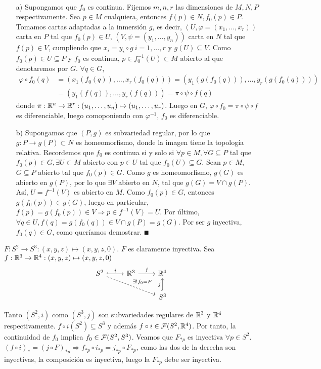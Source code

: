 \documentclass[Cursovd_portada.tex]{subfiles}
\begin{document}
\begin{dem}\
\begin{itemize}
\item[a)] Supongamos que $f_0$ es continua. Fijemos $m,n,r$ las dimensiones de $M,N,P$ respectivamente. Sea $p\in M$ cualquiera, entonces $f(p)\in N, f_0(p)\in P$. Tomamos cartas adaptadas a la inmersión $g$, es decir, $(U,\varphi=(x_1,\dots,x_r))$ carta en $P$ tal que $f_0(p)\in U$, $(V,\psi=(y_1,\dots,y_n))$ carta en $N$ tal que $f(p)\in V$, cumpliendo que $x_i=y_i\circ g\ i=1,\dots, r$ y $g(U)\subseteq V$. Como $f_0(p)\in U\subseteq P$ y $f_0$ es continua, $p\in f_0^{-1}(U)\subset M$ abierto al que denotaremos por $G$. $\forall q\in G$, 
\begin{align*}
\varphi \circ f_0(q)&=(x_1(f_0(q)),\dots,x_r(f_0(q)))= (y_1(g(f_0(q))),\dots,y_r(g(f_0(q))))\\
&=(y_1(f(q)),\dots,y_r(f(q)))=\pi\circ\psi\circ f(q)
\end{align*}
donde $\pi:\mathbb{R}^n\to\mathbb{R}^r: (u_1,\dots, u_n)\mapsto (u_1,\dots,u_r)$. Luego en $G$, $\varphi\circ f_0=\pi\circ\psi\circ f$ es diferenciable, luego comoponiendo con $\varphi^{-1}$, $f_0$ es diferenciable.
\item[b)] Supongamos que $(P,g)$ es subvariedad regular, por lo que $g:P\to g(P)\subset N$ es homeomorfismo, donde la imagen tiene la topología relativa. Recordemos que $f_0$ es continua si y solo si $\forall p\in M,\forall G\subseteq P$ tal que $f_0(p)\in G,\exists U\subset M$ abierto con $p\in U$ tal que $f_0(U)\subseteq G$. Sean $p\in M$, $G\subseteq P$ abierto tal que $f_0(p)\in G$. Como $g$ es homeomorfismo, $g(G)$ es abierto en $g(P)$, por lo que $\exists V$ abierto en $N$, tal que $g(G)=V\cap g(P)$. Así, $U=f^{-1}(V)$ es abierto en $M$. Como $f_0(p)\in G$, entonces $g(f_0(p))\in g(G)$, luego en particular, $f(p)=g(f_0(p))\in V\Rightarrow p\in f^{-1}(V)=U$. Por último, $\forall q\in U, f(q)=g(f_0(q))\in V\cap g(P)=g(G)$. Por ser $g$ inyectiva, $f_0(q)\in G$, como queríamos demostrar.   $\QED$
\end{itemize}

\end{dem}

\begin{ej}
$F:S^2\to S^3:(x,y,z)\mapsto (x,y,z,0)$. $F$ es claramente inyectiva. Sea $f:\mathbb{R}^3\to\mathbb{R}^4:(x,y,z)\mapsto (x,y,z,0)$
\[
\begin{tikzcd}
S^2\arrow[r, hookrightarrow, "i"]\arrow[rrd, dashed, "\exists! f_0=F"] & \R^3\arrow[r,"f"] & \R^4\\
& & S^3\arrow[u, hookrightarrow, "j"]
\end{tikzcd}
\]

Tanto $(S^2,i)$ como $(S^3,j)$ son subvariedades regulares de $\mathbb{R}^3$ y $\mathbb{R}^4$ respectivamente. $f\circ i(S^2)\subseteq  S^3$ y además $f\circ i\in\mathcal{F}(S^2,\mathbb{R}^4)$. Por tanto, la continuidad de $f_0$ implica $f_0\in\mathcal{F}(S^2,S^3)$.  Veamos que $F_{*p}$ es inyectiva $\forall p\in S^2$. $(f\circ i)_*=(j\circ F)_{*p}\Rightarrow f_{*p}\circ i_{*p}=j_{*p}\circ F_{*p}$, como las dos de la derecha son inyectivas, la composición es inyectiva, luego la $F_{*p}$ debe ser inyectiva.
\end{ej}
\end{document}
